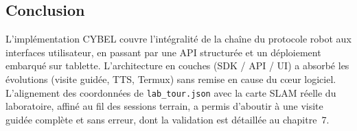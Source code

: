 \subsection{Conclusion}

L'implémentation CYBEL couvre l'intégralité de la chaîne du protocole robot
aux interfaces utilisateur, en passant par une API structurée et un déploiement
embarqué sur tablette. L'architecture en couches (SDK / API / UI) a absorbé
les évolutions (visite guidée, TTS, Termux) sans remise en cause du cœur
logiciel. L'alignement des coordonnées de \texttt{lab\_tour.json} avec la
carte SLAM réelle du laboratoire, affiné au fil des sessions terrain, a
permis d'aboutir à une visite guidée complète et sans erreur, dont la
validation est détaillée au chapitre~7.
